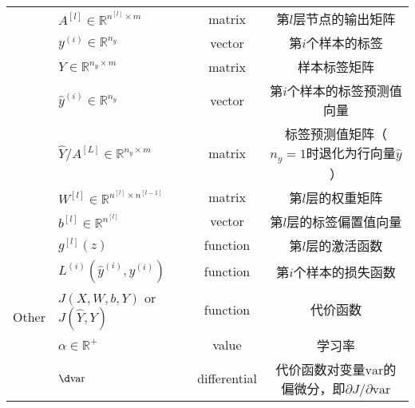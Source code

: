 \begin{table}[htb!]
\begin{threeparttable}
\begin{tabular}{clcc}
                                    & $A^{[l]} \in \mathbb{R}^{n^{[l]} \times {m}}$         & matrix               & 第$l$层节点的输出矩阵                                                         \\
                                    & $y^{(i)} \in \mathbb{R}^{n_y}$                        & vector               & 第$i$个样本的标签                                                         \\
                                    & $Y \in {\mathbb{R}^{n_y \times m}}$                   & matrix               & 样本标签矩阵                                                           \\									
                                    & $\hat{y}^{(i)} \in \mathbb{R}^{n_y}$                  & vector               & 第$i$个样本的标签预测值向量                                                \\
                                    & $\hat{Y} / A^{[L]} \in {\mathbb{R}^{n_y \times m}}$   & matrix               & 标签预测值矩阵（$n_y=1$时退化为行向量$\hat{y}$）   						\\
                                    & $W^{[l]} \in \mathbb{R}^{n^{[l]} \times n^{[l-1]}}$   & matrix               & 第$l$层的权重矩阵                                                               \\
                                    & $b^{[l]} \in \mathbb{R}^{n^{[l]}}$                    & vector               & 第$l$层的标签偏置值向量                                                        \\
        \midrule
        \multirow{5}{*}{Other}      & $g^{[l]}(z)$                                          & function             & 第$l$层的激活函数                                                         \\
                                    & $L^{(i)}(\hat{y}^{(i)}, y^{(i)})$                     & function             & 第$i$个样本的损失函数                                                         \\
                                    & $J(X,W,b,Y)$ or $J(\hat{Y},Y)$                        & function             & 代价函数                                                                        \\
                                    & $\alpha \in \mathbb{R}^+$								& value                & 学习率                                                                        \\
                                    & $\d \mathrm{var}$                                     & differential         & 代价函数对变量$\mathrm{var}$的偏微分，即${\partial J}/{\partial \mathrm{var}}$ \\

\end{tabular}
\end{threeparttable}
\end{table}
